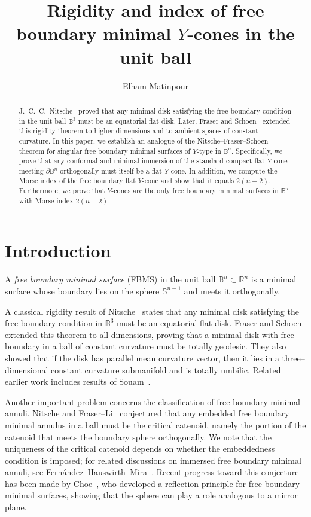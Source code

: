 \documentclass[11pt]{amsart}
\author{Elham Matinpour}
\title{Rigidity and index of free boundary minimal $Y$-cones in the unit ball}
\numberwithin{equation}{section}
\theoremstyle{theorem}
\theoremstyle{definition}
\numberwithin{equation}{section}
\begin{document}
\maketitle

\begin{abstract}
J.~C.~C.~Nitsche~\cite{nitsche1985stationary} proved that any minimal disk satisfying the free boundary condition in the unit ball $\mathbb{B}^3$ must be an equatorial flat disk. Later, Fraser and Schoen~\cite{fraser2015uniqueness} extended this rigidity theorem to higher dimensions and to ambient spaces of constant curvature. 
In this paper, we establish an analogue of the Nitsche--Fraser--Schoen theorem for singular free boundary minimal surfaces of $Y$-type in $\mathbb{B}^n$. Specifically, we prove that any conformal and minimal immersion of the standard compact flat $Y$-cone meeting $\partial \mathbb{B}^n$ orthogonally must itself be a flat $Y$-cone.
In addition, we compute the Morse index of the free boundary flat $Y$-cone and show that it equals $2(n-2)$. Furthermore, we prove that $Y$-cones are the only free boundary minimal surfaces in $\mathbb{B}^n$ with Morse index $2(n-2)$.
\end{abstract}



\section{Introduction}
A \emph{free boundary minimal surface} (FBMS) in the unit ball
$\mathbb{B}^n\subset\mathbb{R}^n$ is a minimal surface whose boundary
lies on the sphere $\mathbb{S}^{n-1}$ and meets it orthogonally.
\medskip

A classical rigidity result of Nitsche~\cite{nitsche1985stationary} states that 
any minimal disk satisfying the free boundary condition in $\mathbb{B}^3$ must 
be an equatorial flat disk. Fraser and Schoen~\cite{fraser2015uniqueness} 
extended this theorem to all dimensions, proving that a minimal disk with free 
boundary in a ball of constant curvature must be totally geodesic. They also 
showed that if the disk has parallel mean curvature vector, then it lies in a 
three–dimensional constant curvature submanifold and is totally umbilic. 
Related earlier work includes results of Souam~\cite{souam1997stability}.

Another important problem concerns the classification of free boundary minimal 
annuli. Nitsche and Fraser--Li~\cite{fraser2014compactness} conjectured that any 
embedded free boundary minimal annulus in a ball must be the critical catenoid, 
namely the portion of the catenoid that meets the boundary sphere orthogonally. We note that the uniqueness of the critical catenoid depends on whether the embeddedness condition is imposed; for related discussions on immersed free boundary minimal annuli, see Fernández--Hauswirth--Mira~\cite{fernandez2023free}.
Recent progress toward this conjecture has been made by Choe~\cite{choe2025free}, 
who developed a reflection principle for free boundary minimal surfaces, showing 
that the sphere can play a role analogous to a mirror plane.
\medskip
\end{document}
